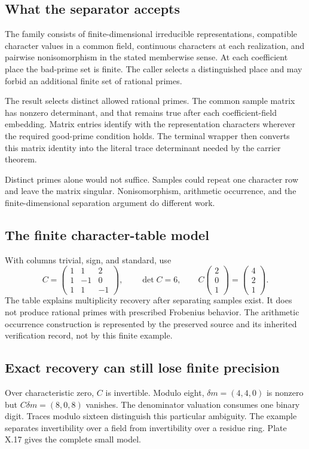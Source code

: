 \subsection{What the separator accepts}
The family consists of finite-dimensional irreducible representations, compatible
character values in a common field, continuous characters at each realization,
and pairwise nonisomorphism in the stated memberwise sense. At each coefficient
place the bad-prime set is finite. The caller selects a distinguished place and
may forbid an additional finite set of rational primes.

The result selects distinct allowed rational primes. The common sample matrix
has nonzero determinant, and that remains true after each coefficient-field
embedding. Matrix entries identify with the representation characters wherever
the required good-prime condition holds. The terminal wrapper then converts this
matrix identity into the literal trace determinant needed by the carrier theorem.

Distinct primes alone would not suffice. Samples could repeat one character row
and leave the matrix singular. Nonisomorphism, arithmetic occurrence, and the
finite-dimensional separation argument do different work.

\subsection{The finite character-table model}
With columns trivial, sign, and standard, use
\[
 C=\begin{pmatrix}1&1&2\\1&-1&0\\1&1&-1\end{pmatrix},
 \qquad \det C=6,
 \qquad C\begin{pmatrix}2\\0\\1\end{pmatrix}
       =\begin{pmatrix}4\\2\\1\end{pmatrix}.
\]
The table explains multiplicity recovery after separating samples exist.
It does not produce rational primes with prescribed Frobenius behavior.
The arithmetic occurrence construction is represented by the preserved source
and its inherited verification record, not by this finite example.

\subsection{Exact recovery can still lose finite precision}
Over characteristic zero, $C$ is invertible. Modulo eight,
$\delta m=(4,4,0)$ is nonzero but $C\delta m=(8,0,8)$ vanishes. The denominator
valuation consumes one binary digit. Traces modulo sixteen distinguish this
particular ambiguity. The example separates invertibility over a field from
invertibility over a residue ring. Plate X.17 gives the complete small model.

